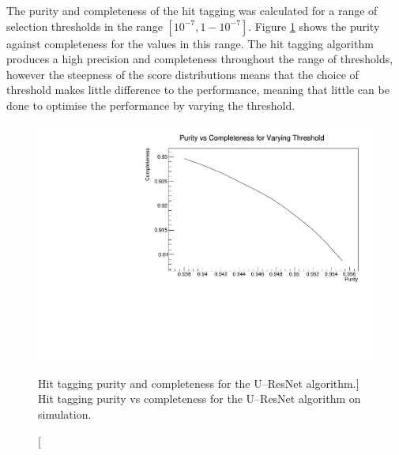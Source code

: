 The purity and completeness of the hit tagging was calculated for a range of 
selection thresholds in the range $[10^{-7}, 1 - 10^{-7}]$. Figure 
\ref{fig:unet_pur_comp} shows the purity against completeness for the values 
in this range. The hit tagging algorithm produces a high precision and 
completeness throughout the range of thresholds, however the steepness of the 
score distributions means that the choice of threshold makes little difference 
to the performance, meaning that little can be done to optimise the performance
by varying the threshold.
\begin{figure}
	\centering
	\includegraphics[width=\textwidth]{figures/unet_pur_v_comp.pdf}
	\caption
	[Hit tagging purity and completeness for the U--ResNet algorithm.]
	{Hit tagging purity vs completeness for the U--ResNet algorithm on 
	\protodune{} simulation.}
	\label{fig:unet_pur_comp}
\end{figure}

